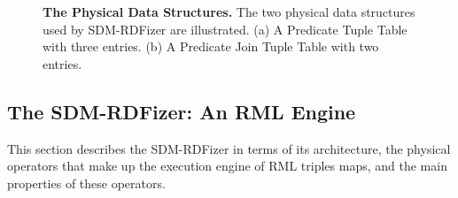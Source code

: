 \begin{figure}[h!]
 \centering

    \caption{{\bf The Physical Data Structures.} The two physical data structures used by SDM-RDFizer are illustrated. (a) A Predicate Tuple Table with three entries. (b) A Predicate Join Tuple Table with two entries.}
    \label{fig:hash_table}
\end{figure}
\subsection{The SDM-RDFizer: An RML Engine}
\label{sec:approach}
This section describes the SDM-RDFizer in terms of its architecture, the physical operators that make up the execution engine of RML triples maps, and the main properties of these operators.  
